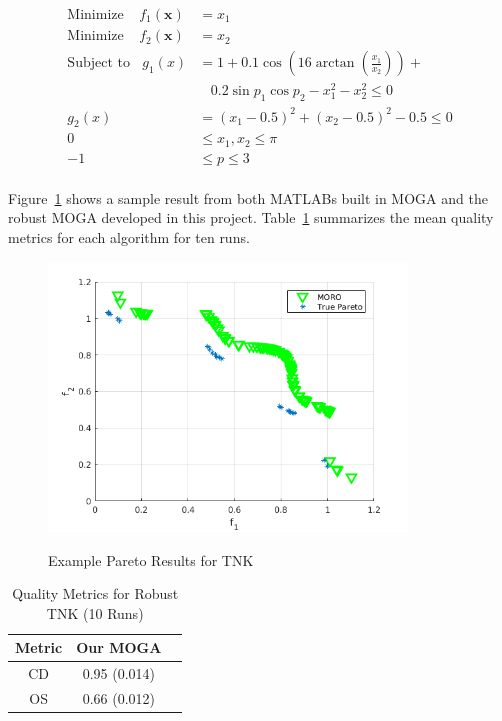 \documentclass{article}
\begin{document}
\begin{align*}
\textrm{Minimize} ~~~~~ f_1(\textbf{x}) &= x_1 \\
\textrm{Minimize} ~~~~~ f_2(\textbf{x}) &= x_2 \\
\textrm{Subject to} ~~~~ g_1(x) &= 1+0.1\cos(16\arctan(\frac{x_1}{x_2})) + \\
&~~~~ 0.2\sin{p_1}\cos{p_2} -x_1^2-x_2^2\leq 0 \\
g_2(x) &= (x_1 - 0.5)^2 + (x_2 - 0.5)^2 -0.5 \leq 0 \\
0 &\leq  x_1,x_2 \leq \pi \\
-1& \leq p \leq 3\\
\end{align*}

\noindent Figure~\ref{fig:robustTNK} shows a sample result from both MATLABs built in MOGA and the robust MOGA developed in this project. Table~\ref{tab:robustTNK} summarizes the mean quality metrics for each algorithm for ten runs. \newline
\begin{figure}[H]
  \caption{Example Pareto Results for TNK}
  \centering
  \includegraphics[width=0.85\textwidth]{prob7_nChr25_nRun400.png}  
  \label{fig:robustTNK}
\end{figure}

\begin{table}[H]
\caption{Quality Metrics for Robust TNK (10 Runs)} 
\centering 
\begin{tabular}{|c|c|c|} 
\hline 
Metric &  Our MOGA \\ \hline
CD & 0.95 (0.014) \\ \hline
OS & 0.66 (0.012) \\ \hline
\end{tabular}
\label{tab:robustTNK} 
\end{table}
 
\end{document}
